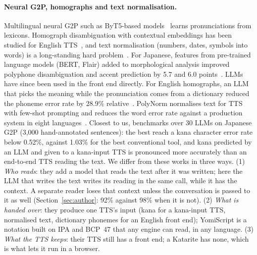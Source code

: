 \documentclass[11pt,a4paper]{article}
\begin{document}
\paragraph{Neural G2P, homographs and text normalisation.} Multilingual neural G2P such as ByT5-based
models~\citep{zhu2022byt5g2p} learns pronunciations from lexicons. Homograph disambiguation with contextual
embeddings has been studied for English TTS~\citep{nicolis2021homograph}, and text normalisation (numbers, dates,
symbols into words) is a long-standing hard problem~\citep{sproat2016normalization}. For Japanese, features from
pre-trained language models (BERT, Flair) added to morphological analysis improved polyphone disambiguation and accent
prediction by 5.7 and 6.0 points~\citep{hida2022polyphone}. LLMs have since been used in the front end directly. For
English homographs, an LLM that picks the meaning while the pronunciation comes from a dictionary reduced the phoneme
error rate by 28.9\% relative~\citep{han2024ickr}. PolyNorm normalises text for TTS with few-shot prompting and reduces
the word error rate against a production system in eight languages~\citep{wong2025polynorm}. Closest to us,
\citet{koriyama2026g2p} benchmarks over 30 LLMs on Japanese G2P (3{,}000 hand-annotated sentences): the best reach a
kana character error rate below 0.52\%, against 1.03\% for the best conventional tool, and kana predicted by an LLM and
given to a kana-input TTS is pronounced more accurately than an end-to-end TTS reading the text. We differ from these
works in three ways. (1) \emph{Who reads}: they add a model that reads the text after it was written; here the LLM that
writes the text writes its reading in the same call, while it has the context. A separate reader loses that context
unless the conversation is passed to it as well (Section~\ref{sec:author}: 92\% against 98\% when it is not).
(2) \emph{What is handed over}: they produce one TTS's input (kana for a kana-input TTS, normalised text, dictionary
phonemes for an English front end); YomiScript is a notation built on IPA and BCP~47 that any engine can read, in any
language. (3) \emph{What the TTS keeps}: their TTS still has a front end; a Katarite has none, which is what lets it
run in a browser.
\end{document}
